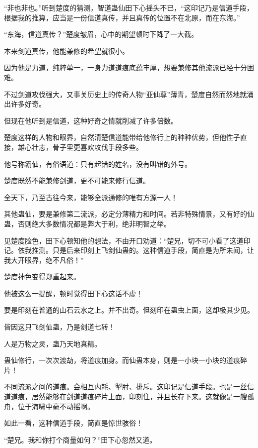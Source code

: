 
\begin{this_body}

“非也非也。”听到楚度的猜测，智道蛊仙田下心摇头不已，“这印记乃是信道手段，根据我的推算，应当是一份信道真传，并且真传的位置不在北原，而在东海。”

“东海，信道真传？”楚度皱眉，心中的期望顿时下降了一大截。

本来剑道真传，他能兼修的希望就很小。

因为他是力道，纯粹单一，一身力道道痕底蕴丰厚，想要兼修其他流派已经十分困难。

不过剑道攻伐强大，又事关历史上的传奇人物“亚仙尊”薄青，楚度自然而然地就涌出许多好奇。

但现在他听到是信道，这种好奇之情就削减了许多倍数。

楚度这样的人物和眼界，自然清楚信道能带给他修行上的种种优势，但他性子直接，雄心壮志，骨子里更喜欢攻伐手段多些。

他号称霸仙，有俗语道：只有起错的姓名，没有叫错的外号。

楚度既然不能兼修剑道，更不可能来修行信道。

全天下，乃至古往今来，能够全派通修的唯有方源一人！

其他蛊仙，要是兼修第二流派，必定分薄精力和时间。若非特殊情景，又有好的仙蛊，否则绝大多数情况都是弊大于利，绝非明智之举。

见楚度脸色，田下心顿知他的想法，不由开口劝道：“楚兄，切不可小看了这道印记。依我推测。只是后来印刻上飞剑仙蛊的。这种信道手段，简直是为所未闻，让我大开眼界，绝不凡俗！”

楚度神色变得郑重起来。

他被这么一提醒，顿时觉得田下心这话不虚！

要是印刻在普通的山石云水之上。并不出奇。但刻印在蛊虫上面，这却极其少见。

皆因这只飞剑仙蛊，乃是剑道七转！

人是万物之灵，蛊乃天地真精。

蛊仙修行，一次次渡劫，将道痕加身。而仙蛊本身，则是一小块一小块的道痕碎片！

不同流派之间的道痕。会相互内耗、掣肘、排斥。这印记是信道手段。也是一丝信道道痕，居然能够在剑道道痕碎片上面，印刻住，并且长存下来。这就像是一艘孤舟，位于海啸中毫不动摇啊。

如此一看，这种信道手段，简直是惊世骇俗！

“楚兄。我和你打个商量如何？”田下心忽然又道。


\end{this_body}
